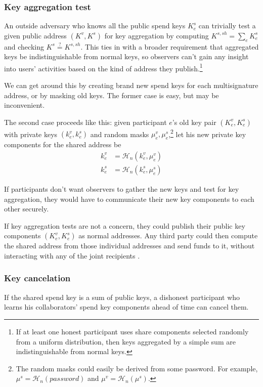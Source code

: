 \subsubsection*{Key aggregation test}
An outside adversary who knows all the public spend keys $K^{s}_e$ can trivially test a given public address $(K^v,K^s)$ for key aggregation by computing $K^{s,sh} = \sum_e K^{s}_e$ and checking $K^s \stackrel{?}{=} K^{s,sh}$. This ties in with a broader requirement that aggregated keys be indistinguishable from normal keys, so observers can't gain any insight into users' activities based on the kind of address they publish.\footnote{If at least one honest participant uses share components selected randomly from a uniform distribution, then keys aggregated by a simple sum are indistinguishable \cite{SCOZZAFAVA1993313} from normal keys.}%

We can get around this by creating brand new spend keys for each multisignature address, or by masking old keys. The former case is easy, but may be inconvenient.

The second case proceeds like this: given participant $e$'s old key pair $(K^v_e,K^s_e)$ with private keys $(k^v_e,k^s_e)$ and random masks $\mu^v_e,\mu^s_e$,\footnote{The random masks could easily be derived from some password. For example, $\mu^s = \mathcal{H}_n(password)$ and $\mu^v = \mathcal{H}_n(\mu^s)$.} let his new private key components for the shared address be
\begin{align*}
    k^{v}_e &= \mathcal{H}_n(k^v_e,\mu^v_e)\\
    k^{s}_e &= \mathcal{H}_n(k^s_e,\mu^s_e)
\end{align*}

If participants don't want observers to gather the new keys and test for key aggregation, they would have to communicate their new key components to each other securely. 

If key aggregation tests are not a concern, they could publish their public key components $(K^{v}_e,K^{s}_e)$ as normal addresses. Any third party could then compute the shared address from those individual addresses and send funds to it, without interacting with any of the joint recipients \cite{maxwell2018simple}.

\subsubsection*{Key cancelation}

If the shared spend key is a sum of public keys, a dishonest participant who learns his collaborators' spend key components ahead of time can cancel them. 

